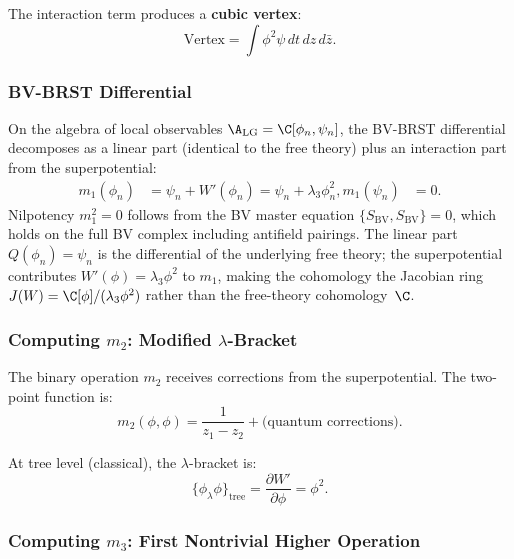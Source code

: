 The interaction term produces a \textbf{cubic vertex}:
\begin{equation}
\text{Vertex} = \int \phi^2 \psi \, dt \, dz \, d\bar{z}.
\end{equation}

\subsubsection{BV-BRST Differential}

On the algebra of local observables $\A_{\text{LG}} = \C[\phi_n, \psi_n]$, the BV-BRST differential decomposes as a linear part (identical to the free theory) plus an interaction part from the superpotential:
\begin{align}
m_1(\phi_n) &= \psi_n + W'(\phi_n) = \psi_n + \lambda_3 \phi_n^2, %
m_1(\psi_n) &= 0. %
\end{align}
Nilpotency $m_1^2 = 0$ follows from the BV master equation $\{S_{\mathrm{BV}}, S_{\mathrm{BV}}\} = 0$, which holds on the full BV complex including antifield pairings. The linear part $Q(\phi_n) = \psi_n$ is the differential of the underlying free theory; the superpotential contributes $W'(\phi) = \lambda_3\phi^2$ to $m_1$, making the cohomology the Jacobian ring $J(W) = \C[\phi]/(\lambda_3 \phi^2)$ rather than the free-theory cohomology~$\C$.

\subsubsection{Computing $m_2$: Modified $\lambda$-Bracket}

The binary operation $m_2$ receives corrections from the superpotential. The two-point function is:
\begin{equation}
m_2(\phi, \phi) = \frac{1}{z_1 - z_2} + \text{(quantum corrections)}.
\end{equation}

At tree level (classical), the $\lambda$-bracket is:
\begin{equation}
\{\phi_\lambda \phi\}_{\text{tree}} = \frac{\partial W'}{\partial \phi} = \phi^2.
\end{equation}

\subsubsection{Computing $m_3$: First Nontrivial Higher Operation}

